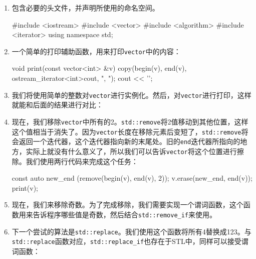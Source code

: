 \begin{enumerate}
\item 包含必要的头文件，并声明所使用的命名空间。

\begin{codebox}[cpp]
#include <iostream>
#include <vector>
#include <algorithm>
#include <iterator>
using namespace std;
\end{codebox}

\item 一个简单的打印辅助函数，用来打印\texttt{vector}中的内容：

\begin{codebox}[cpp]
void print(const vector<int> &v)
{
    copy(begin(v), end(v), ostream_iterator<int>{cout, ", "});
    cout << '\n';
}
\end{codebox}

\item 我们将使用简单的整数对\texttt{vector}进行实例化。然后，对\texttt{vector}进行打印，这样就能和后面的结果进行对比：

\begin{codebox}[cpp]
int main()
{
    vector<int> v {1, 2, 3, 4, 5, 6};
    print(v);
\end{codebox}

\item 现在，我们移除\texttt{vector}中所有的2。\texttt{std::remove}将2值移动到其他位置，这样这个值相当于消失了。因为\texttt{vector}长度在移除元素后变短了，\texttt{std::remove}将会返回一个迭代器，这个迭代器指向新的末尾处。旧的\texttt{end}迭代器所指向的地方，实际上就没有什么意义了，所以我们可以告诉\texttt{vector}将这个位置进行擦除。我们使用两行代码来完成这个任务：

\begin{codebox}[cpp]
{
    const auto new_end (remove(begin(v), end(v), 2));
    v.erase(new_end, end(v));
}
print(v);
\end{codebox}

\item 现在，我们来移除奇数。为了完成移除，我们需要实现一个谓词函数，这个函数用来告诉程序哪些值是奇数，然后结合\texttt{std::remove\_if}来使用。


\item 下一个尝试的算法是\texttt{std::replace}。我们使用这个函数将所有4替换成123。与\texttt{std::replace}函数对应，\texttt{std::replace\_if}也存在于STL中，同样可以接受谓词函数：


\end{enumerate}
